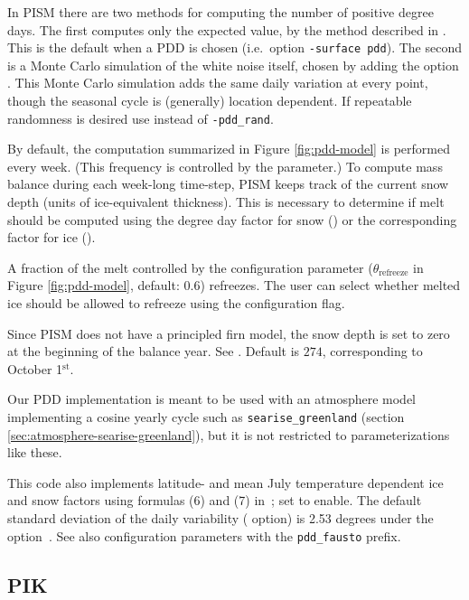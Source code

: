 \documentclass[titlepage,letterpaper,final]{scrartcl}
\begin{document}
In PISM there are two methods for computing the number of positive degree days.
The first computes only the expected value, by the method described in
\cite{CalovGreve05}. This is the default when a PDD is chosen (i.e.~option
\texttt{-surface~pdd}). The second is a Monte Carlo simulation of the white
noise itself, chosen by adding the option . This Monte
Carlo simulation adds the same daily variation at every point, though the
seasonal cycle is (generally) location dependent. If repeatable randomness is
desired use  instead of \texttt{-pdd_rand}.

By default, the computation summarized in Figure \ref{fig:pdd-model}
is performed every week. (This frequency is controlled by the
 parameter.) To compute mass balance
during each week-long time-step, PISM keeps track of the current snow
depth (units of ice-equivalent thickness). This is necessary to
determine if melt should be computed using the degree day factor for
snow () or the corresponding factor for ice
().

A fraction of the melt controlled by the configuration parameter
 ($\theta_{\text{refreeze}}$ in Figure
\ref{fig:pdd-model}, default: $0.6$) refreezes. The user can select
whether melted ice should be allowed to refreeze using the
 configuration flag.

Since PISM does not have a principled firn model, the snow depth is
set to zero at the beginning of the balance year. See
. Default is $274$, corresponding
to October 1$^{\text{st}}$.

Our PDD implementation is meant to be used with an atmosphere model
implementing a cosine yearly cycle such as \texttt{searise_greenland} (section
\ref{sec:atmosphere-searise-greenland}), but it is not restricted to
parameterizations like these.

This code also implements latitude- and mean July temperature dependent ice and snow
factors using formulas (6) and (7) in~\cite{Faustoetal2009}; set
 to enable. The default standard deviation of the
daily variability ( option) is 2.53 degrees under the
 option~\cite{Faustoetal2009}. See also configuration
parameters with the \texttt{pdd_fausto} prefix.

\subsection{PIK}
\label{sec:surface-pik}
\end{document}
